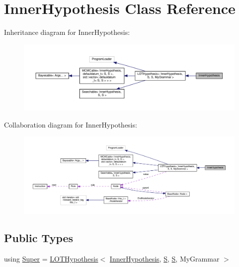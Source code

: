 \hypertarget{class_inner_hypothesis}{}\section{Inner\+Hypothesis Class Reference}
\label{class_inner_hypothesis}


Inheritance diagram for Inner\+Hypothesis\+:\nopagebreak
\begin{figure}[H]
\begin{center}
\leavevmode
\includegraphics[width=350pt]{class_inner_hypothesis__inherit__graph}
\end{center}
\end{figure}


Collaboration diagram for Inner\+Hypothesis\+:
\nopagebreak
\begin{figure}[H]
\begin{center}
\leavevmode
\includegraphics[width=350pt]{class_inner_hypothesis__coll__graph}
\end{center}
\end{figure}
\subsection*{Public Types}
\begin{DoxyCompactItemize}
\item 
using \hyperlink{class_inner_hypothesis_a1a69a8dd433b64b725be0b2436d6df0c}{Super} = \hyperlink{class_l_o_t_hypothesis}{L\+O\+T\+Hypothesis}$<$ \hyperlink{class_inner_hypothesis}{Inner\+Hypothesis}, \hyperlink{_models_2_formal_language_theory-_complex_2_main_8cpp_a51c40915539205f0b5add30b0d68a4cb}{S}, \hyperlink{_models_2_formal_language_theory-_complex_2_main_8cpp_a51c40915539205f0b5add30b0d68a4cb}{S}, My\+Grammar $>$
\end{DoxyCompactItemize}
